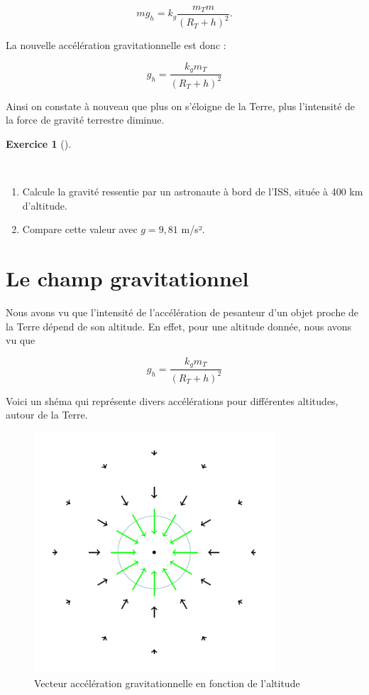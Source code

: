 \documentclass[
  letterpaper,
  DIV=11,
  numbers=noendperiod]{scrartcl}
\providecommand{\tightlist}{%
  \setlength{\itemsep}{0pt}\setlength{\parskip}{0pt}}\usepackage{longtable,booktabs,array}
\theoremstyle{definition}
\newtheorem{exercise}{Exercice}[section]
\theoremstyle{definition}
\theoremstyle{definition}
\theoremstyle{remark}
\begin{document}
\[
mg_h=k_g\dfrac{m_Tm}{(R_T+h)^2}.
\]

La nouvelle accélération gravitationnelle est donc :

\[
g_h = \frac{k_g m_T}{(R_T + h)^2}
\]

Ainsi on constate à nouveau que plus on s'éloigne de la Terre, plus
l'intensité de la force de gravité terrestre diminue.

\begin{exercise}[]\protect\hypertarget{exr-gravite-altitude}{}\label{exr-gravite-altitude}

~

\begin{enumerate}
\def\labelenumi{\arabic{enumi}.}
\tightlist
\item
  Calcule la gravité ressentie par un astronaute à bord de l'ISS, située
  à 400 km d'altitude.
\item
  Compare cette valeur avec \(g = 9,81\) m/s².
\end{enumerate}

\end{exercise}

\section{Le champ gravitationnel}\label{le-champ-gravitationnel}

Nous avons vu que l'intensité de l'accélération de pesanteur d'un objet
proche de la Terre dépend de son altitude. En effet, pour une altitude
donnée, nous avons vu que

\[
g_h = \frac{k_g m_T}{(R_T + h)^2}
\]

Voici un shéma qui représente divers accélérations pour différentes
altitudes, autour de la Terre.

\begin{figure}[H]

{\centering \includegraphics[width=0.8\textwidth,height=\textheight]{figures/grav/fig6.pdf}

}

\caption{Vecteur accélération gravitationnelle en fonction de
l'altitude}

\end{figure}%
\end{document}
